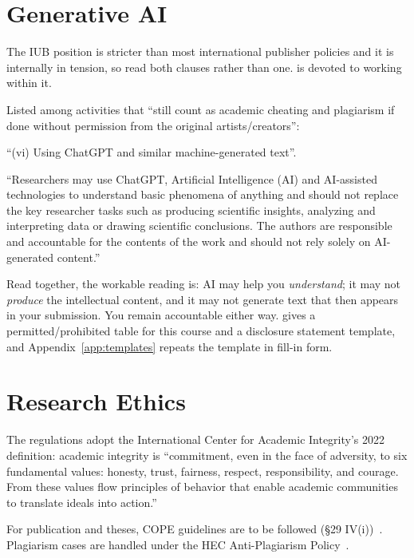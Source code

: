 \section{Generative AI}

The IUB position is stricter than most international publisher policies and it
is internally in tension, so read both clauses rather than one.
 is devoted to working within it.

\begin{regbox}
Listed among activities that ``still count as academic cheating and plagiarism
if done without permission from the original artists/creators'':

\medskip
``(vi) Using ChatGPT and similar machine-generated text''.
\end{regbox}

\begin{regbox}
``Researchers may use ChatGPT, Artificial Intelligence (AI) and AI-assisted
technologies to understand basic phenomena of anything and should not replace
the key researcher tasks such as producing scientific insights, analyzing and
interpreting data or drawing scientific conclusions. The authors are
responsible and accountable for the contents of the work and should not rely
solely on AI-generated content.''
\end{regbox}

\noindent
Read together, the workable reading is: AI may help you \emph{understand};
it may not \emph{produce} the intellectual content, and it may not
generate text that then appears in your submission. You remain accountable
either way.  gives a permitted/prohibited table for this course
and a disclosure statement template, and Appendix~\ref{app:templates} repeats
the template in fill-in form.

\section{Research Ethics}

\begin{regbox}
The regulations adopt the International Center for Academic Integrity's 2022
definition: academic integrity is ``commitment, even in the face of adversity,
to six fundamental values: honesty, trust, fairness, respect, responsibility,
and courage. From these values flow principles of behavior that enable academic
communities to translate ideals into action.''

\medskip
For publication and theses, COPE guidelines are to be followed
(\S29 IV(i))~\cite{cope2019corepractices}. Plagiarism cases are handled under
the HEC Anti-Plagiarism Policy~\cite{hec2023plagiarism}.
\end{regbox}

